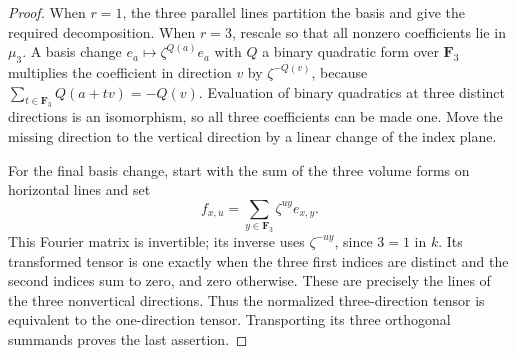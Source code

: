 \documentclass[11pt]{article}
\theoremstyle{definition}\newtheorem{definition}[theorem]{Definition}
\theoremstyle{remark}\newtheorem{remark}[theorem]{Remark}
\newcommand{\FF}{\mathbf F}
\begin{document}
\begin{proof}
When $r=1$, the three parallel lines partition the basis and give the required decomposition. When $r=3$, rescale so that all nonzero coefficients lie in $\mu_3$. A basis change $e_a\mapsto\zeta^{Q(a)}e_a$ with $Q$ a binary quadratic form over $\FF_3$ multiplies the coefficient in direction $v$ by $\zeta^{-Q(v)}$, because $\sum_{t\in\FF_3}Q(a+tv)=-Q(v)$. Evaluation of binary quadratics at three distinct directions is an isomorphism, so all three coefficients can be made one. Move the missing direction to the vertical direction by a linear change of the index plane.

For the final basis change, start with the sum of the three volume forms on horizontal lines and set
\[
 f_{x,u}=\sum_{y\in\FF_3}\zeta^{uy}e_{x,y}.
\]
This Fourier matrix is invertible; its inverse uses $\zeta^{-uy}$, since $3=1$ in $k$. Its transformed tensor is one exactly when the three first indices are distinct and the second indices sum to zero, and zero otherwise. These are precisely the lines of the three nonvertical directions. Thus the normalized three-direction tensor is equivalent to the one-direction tensor. Transporting its three orthogonal summands proves the last assertion.
\end{proof}
\end{document}
